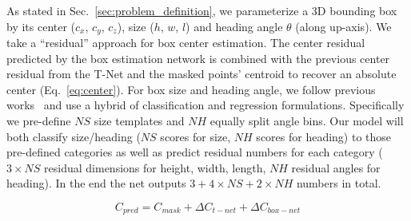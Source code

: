 As stated in Sec.~\ref{sec:problem_definition}, we parameterize a 3D bounding box by its center ($c_x$, $c_y$, $c_z$), size ($h$, $w$, $l$) and heading angle $\theta$ (along up-axis). We take a ``residual'' approach for box center estimation. The center residual predicted by the box estimation network is combined with the previous center residual from the T-Net and the masked points' centroid to recover an absolute center (Eq.~\ref{eq:center}). For box size and heading angle, we follow previous works~\cite{ren2015faster, mousavian20163d} and use a hybrid of classification and regression formulations. Specifically we pre-define $NS$ size templates and $NH$ equally split angle bins. Our model will both classify size/heading ($NS$ scores for size, $NH$ scores for heading) to those pre-defined categories as well as predict residual numbers for each category ($3\times NS$ residual dimensions for height, width, length, $NH$ residual angles for heading). In the end the net outputs $3+4\times NS+2\times NH$ numbers in total.

\begin{equation}
    \label{eq:center}
    C_{pred} = C_{mask} + \Delta C_{t-net} + \Delta C_{box-net}
\end{equation}




